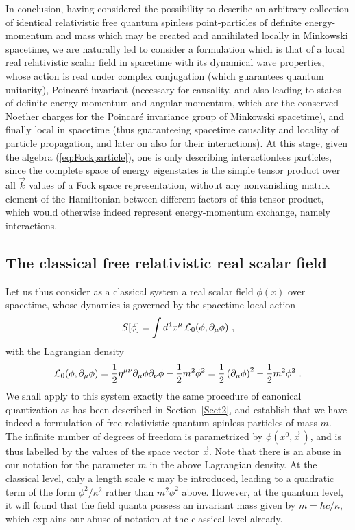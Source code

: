 \documentclass[a4paper,11pt]{article}
\begin{document}
In conclusion, having considered the possibility to describe an
arbitrary collection of identical relativistic free quantum spinless 
point-particles of de\-fi\-ni\-te energy-momentum and mass which
may be created and annihilated locally in Minkowski spacetime, we are
naturally led to consider a formulation which is that of a local real
relativistic scalar field in spacetime with its dy\-na\-mi\-cal wave 
properties, 
whose action is real under complex conjugation (which guarantees quantum 
unitarity), Poincar\'e invariant (necessary for causality, and also leading 
to states of definite energy-momentum and angular momentum, which are the 
conserved Noether charges for the Poincar\'e invariance group of Minkowski 
spacetime), and finally local in spacetime (thus gua\-ran\-tee\-ing spacetime 
causality and locality of particle propagation, and later on also for their 
interactions). At this stage, given the algebra
(\ref{eq:Fockparticle}), one is only describing interactionless
particles, since the complete space of energy eigenstates is the simple
tensor product over all $\vec{k}$ values of a Fock space representation,
without any nonvanishing matrix element of the Hamiltonian between
dif\-fe\-rent factors of this tensor product, which would otherwise indeed
represent energy-momentum exchange, namely interactions.

\subsection{The classical free relativistic real scalar field}
\label{Subsect3.2}

Let us thus consider as a classical system a real scalar field $\phi(x)$ 
over spacetime, whose dynamics is governed by the spacetime local action
\begin{equation}
S[\phi]=\int d^4x^\mu\,{\cal L}_0(\phi,\partial_\mu\phi)\ ,
\end{equation}
with the Lagrangian density
\begin{equation}
{\cal L}_0(\phi,\partial_\mu\phi)=
\frac{1}{2}\eta^{\mu\nu}\partial_\mu\phi\partial_\nu\phi-\frac{1}{2}m^2\phi^2=
\frac{1}{2}\left(\partial_\mu\phi\right)^2- \frac{1}{2}m^2\phi^2\ .
\end{equation}
We shall apply to this system exactly the same procedure of canonical
quantization as has been described in Section~\ref{Sect2}, and establish that
we have indeed a formulation of free relativistic quantum spinless
particles of mass $m$. The infinite number of degrees of freedom is 
parametrized by $\phi(x^0,\vec{x}\,)$, and is thus labelled by the values 
of the space vector $\vec{x}$. Note that there is an abuse
in our notation for the parameter $m$ in the above Lagrangian density.
At the classical level, only a length scale $\kappa$ may be introduced,
leading to a quadratic term of the form $\phi^2/\kappa^2$ rather than
$m^2\phi^2$ above. However, at the quantum level, it will found that
the field quanta possess an invariant mass given by $m=\hbar c/\kappa$,
which explains our abuse of notation at the classical level already.
\end{document}
